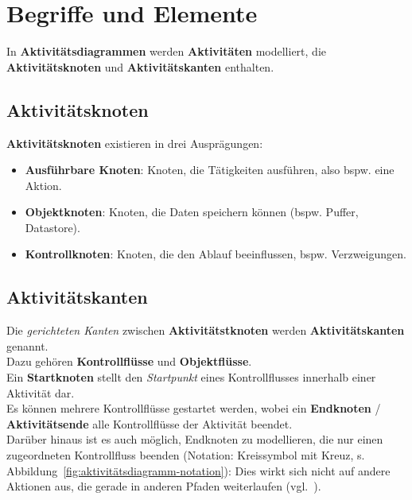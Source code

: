 \section{Begriffe und Elemente}\label{sec:aktivitaetsdiagramme-begriffe-und-elemente}

In \textbf{Aktivitätsdiagrammen} werden \textbf{Aktivitäten} modelliert, die \textbf{Aktivitätsknoten} und \textbf{Aktivitätskanten} enthalten.

\subsection{Aktivitätsknoten}

\textbf{Aktivitätsknoten} existieren in drei Ausprägungen:

\begin{itemize}
    \item \textbf{Ausführbare Knoten}: Knoten, die Tätigkeiten ausführen, also bspw. eine Aktion.
    \item \textbf{Objektknoten}: Knoten, die Daten speichern können (bspw. Puffer, Datastore).
    \item \textbf{Kontrollknoten}: Knoten, die den Ablauf beeinflussen, bspw. Verzweigungen.
\end{itemize}

\subsection{Aktivitätskanten}
Die \textit{gerichteten Kanten} zwischen \textbf{Aktivitätstknoten}  werden \textbf{Aktivitätskanten} genannt.\\
Dazu gehören \textbf{Kontrollflüsse} und \textbf{Objektflüsse}.\\

\noindent
Ein \textbf{Startknoten} stellt den \textit{Startpunkt} eines Kontrollflusses innerhalb einer Aktivität dar.\\
Es können mehrere Kontrollflüsse gestartet werden, wobei ein \textbf{Endknoten} / \textbf{Aktivitätsende} alle Kontrollflüsse der Aktivität beendet.\\

\noindent
Darüber hinaus ist es auch möglich, Endknoten zu modellieren, die nur einen zugeordneten Kontrollfluss beenden (Notation: Kreissymbol mit Kreuz, s. Abbildung~\ref{fig:aktivitätsdiagramm-notation}): Dies wirkt sich nicht auf andere Aktionen aus, die gerade in anderen Pfaden weiterlaufen (vgl.~\cite[72]{Bal05}).\\

